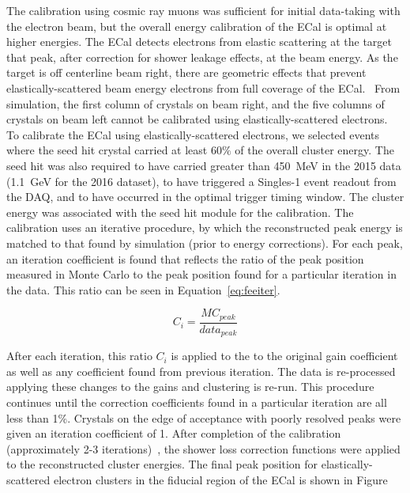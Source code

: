 The calibration using cosmic ray muons was sufficient for initial data-taking with the electron beam, but the overall energy calibration of the ECal is optimal at higher energies. The ECal detects electrons from elastic scattering at the target that peak, after correction for shower leakage effects, at the beam energy. As the target is off centerline beam right, there are geometric effects that prevent elastically-scattered beam energy electrons from full coverage of the ECal.~\cite{szumila-vance_hps_2016} From simulation, the first column of crystals on beam right, and the five columns of crystals on beam left cannot be calibrated using elastically-scattered electrons. \\
\indent To calibrate the ECal using elastically-scattered electrons, we selected events where the seed hit crystal carried at least 60$\%$ of the overall cluster energy. The seed hit was also required to have carried greater than 450~MeV in the 2015 data (1.1~GeV for the 2016 dataset), to have triggered a Singles-1  event readout from the DAQ, and to have occurred in the optimal trigger timing window. The cluster energy was associated with the seed hit module for the calibration. The calibration uses an iterative procedure, by which the reconstructed peak energy is matched to that found by simulation (prior to energy corrections). For each peak, an iteration coefficient is found that reflects the ratio of the peak position measured in Monte Carlo to the peak position found for a particular iteration in the data. This ratio can be seen in Equation~\eqref{eq:feeiter}.

\begin{equation}
	\label{eq:feeiter}
	C_i = \dfrac{MC_{peak}}{data_{peak}}
\end{equation}

After each iteration, this ratio $C_i$ is applied to the to the original gain coefficient as well as any coefficient found from previous iteration. The data is re-processed applying these changes to the gains and clustering is re-run. This procedure continues until the correction coefficients found in a particular iteration are all less than 1$\%$. Crystals on the edge of acceptance with poorly resolved peaks were given an iteration coefficient of 1. After completion of the calibration (approximately 2-3 iterations)~\cite{szumila-vance_hps_2016}, the shower loss correction functions were applied to the reconstructed cluster energies. The final peak position for elastically-scattered electron clusters in the fiducial region of the ECal is shown in Figure

